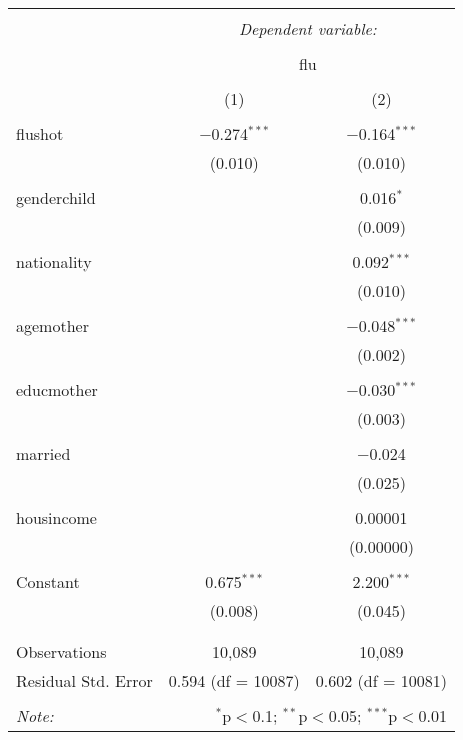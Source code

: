 \documentclass[
]{article}
\begin{document}
\begin{table}[!htbp] \centering 
  \caption{} 
  \label{} 
\begin{tabular}{@{\extracolsep{5pt}}lcc} 
\\[-1.8ex]\hline 
\hline \\[-1.8ex] 
 & \multicolumn{2}{c}{\textit{Dependent variable:}} \\ 
\cline{2-3} 
\\[-1.8ex] & \multicolumn{2}{c}{flu} \\ 
\\[-1.8ex] & (1) & (2)\\ 
\hline \\[-1.8ex] 
 flushot & $-$0.274$^{***}$ & $-$0.164$^{***}$ \\ 
  & (0.010) & (0.010) \\ 
  & & \\ 
 genderchild &  & 0.016$^{*}$ \\ 
  &  & (0.009) \\ 
  & & \\ 
 nationality &  & 0.092$^{***}$ \\ 
  &  & (0.010) \\ 
  & & \\ 
 agemother &  & $-$0.048$^{***}$ \\ 
  &  & (0.002) \\ 
  & & \\ 
 educmother &  & $-$0.030$^{***}$ \\ 
  &  & (0.003) \\ 
  & & \\ 
 married &  & $-$0.024 \\ 
  &  & (0.025) \\ 
  & & \\ 
 housincome &  & 0.00001 \\ 
  &  & (0.00000) \\ 
  & & \\ 
 Constant & 0.675$^{***}$ & 2.200$^{***}$ \\ 
  & (0.008) & (0.045) \\ 
  & & \\ 
\hline \\[-1.8ex] 
Observations & 10,089 & 10,089 \\ 
Residual Std. Error & 0.594 (df = 10087) & 0.602 (df = 10081) \\ 
\hline 
\hline \\[-1.8ex] 
\textit{Note:}  & \multicolumn{2}{r}{$^{*}$p$<$0.1; $^{**}$p$<$0.05; $^{***}$p$<$0.01} \\ 
\end{tabular} 
\end{table}
\end{document}
